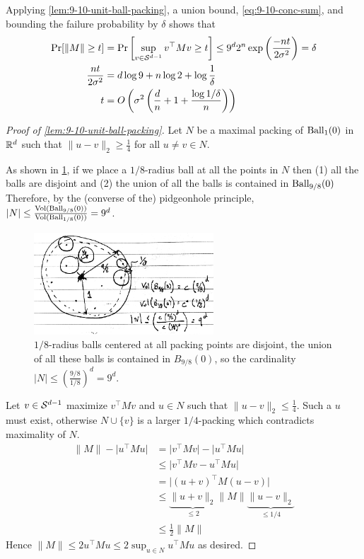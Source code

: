 Applying \cref{lem:9-10-unit-ball-packing}, a union bound, \cref{eq:9-10-conc-sum},
and bounding the failure probability by $\delta$
shows that
\begin{align}
    \Pr[ \|M\| \geq t ]
    &= \Pr\left[ \sup_{v \in \mathcal{S}^{d-1}} v^\top M v \geq t \right]
    \leq 9^d 2^n \exp\left(\frac{-nt}{2 \sigma^2}\right) = \delta \\
    \frac{n t}{2 \sigma^2} &= d \log 9 + n \log 2 + \log \frac{1}{\delta} \\
    t &= O\left(\sigma^2 \left( \frac{d}{n} + 1 + \frac{\log 1/\delta}{n} \right)\right)
\end{align}

\begin{proof}[Proof of \cref{lem:9-10-unit-ball-packing}]
    Let $N$ be a maximal packing of $\operatorname{Ball}_1(0)$ in $\mathbb{R}^d$
    such that $\|u - v\|_2 \geq \frac{1}{4}$ for all $u \neq v \in N$.

    As shown in \cref{fig:9-10-1}, if we place a $1/8$-radius ball at all the
    points in $N$ then (1) all the balls are disjoint and (2) the union of all the balls is
    contained in $\operatorname{Ball}_{9/8}(0)$ Therefore, by the (converse of the) pidgeonhole principle,
    $\lvert N \rvert \leq \frac{\operatorname{Vol}(\operatorname{Ball}_{9/8}(0))}{\operatorname{Vol}(\operatorname{Ball}_{1/8}(0))} = 9^d$.

    \begin{figure}[H]
        \centering
        \includegraphics[width=0.6\textwidth]{figures/9-10-1.png}
        \caption{$1/8$-radius balls centered
            at all packing points are disjoint, the union of all these balls is contained in $B_{9/8}(0)$,
            so the cardinality $\lvert N \rvert \leq \left(\frac{9/8}{1/8}\right)^d = 9^d$.}
        \label{fig:9-10-1}
    \end{figure}

    Let $v \in \mathcal{S}^{d-1}$ maximize $v^\top M v$
    and $u \in N$ such that $\|u - v\|_2 \leq \frac{1}{4}$.
    Such a $u$ must exist,
    otherwise $N \cup \{v\}$ is a larger $1/4$-packing which contradicts maximality of $N$.
    \begin{align}
        \|M\| - \lvert u^\top M u \rvert
        &= \lvert v^\top M v \rvert - \lvert u^\top M u \rvert \\
        &\leq \lvert v^\top M v - u^\top M u \rvert \\
        &= \lvert (u + v)^\top M (u - v) \rvert \\
        &\leq \underbrace{\|u + v\|_2}_{\leq 2} \|M\| \underbrace{\|u - v\|_2}_{\leq 1/4} \\
        &\leq \frac{1}{2} \|M\|
    \end{align}
    Hence $\|M\| \leq 2 u^\top M u \leq 2 \sup_{u \in N} u^\top M u$ as desired.
\end{proof}

